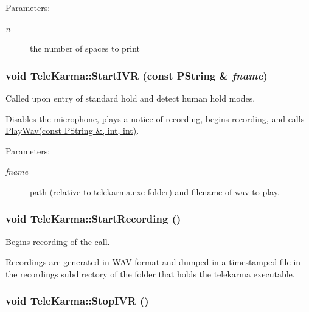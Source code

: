 \begin{Desc}
\item[Parameters:]
\begin{description}
\item[{\em n}]the number of spaces to print \end{description}
\end{Desc}
\hypertarget{classTeleKarma_e7fa2e0e51af227908ddf46de42732f2}{
\subsubsection[{StartIVR}]{\setlength{\rightskip}{0pt plus 5cm}void TeleKarma::StartIVR (const PString \& {\em fname})}}
\label{classTeleKarma_e7fa2e0e51af227908ddf46de42732f2}


Called upon entry of standard hold and detect human hold modes. 

Disables the microphone, plays a notice of recording, begins recording, and calls \hyperlink{}{PlayWav(const PString \&, int, int)}. \begin{Desc}
\item[Parameters:]
\begin{description}
\item[{\em fname}]path (relative to telekarma.exe folder) and filename of wav to play. \end{description}
\end{Desc}
\hypertarget{classTeleKarma_724b39dce3dd92f25a7de9e4a39ccfa7}{
\subsubsection[{StartRecording}]{\setlength{\rightskip}{0pt plus 5cm}void TeleKarma::StartRecording ()}}
\label{classTeleKarma_724b39dce3dd92f25a7de9e4a39ccfa7}


Begins recording of the call. 

Recordings are generated in WAV format and dumped in a timestamped file in the recordings subdirectory of the folder that holds the telekarma executable. \hypertarget{classTeleKarma_9b93b7a0b3af465d07a5facaa445344f}{
\subsubsection[{StopIVR}]{\setlength{\rightskip}{0pt plus 5cm}void TeleKarma::StopIVR ()}}
\label{classTeleKarma_9b93b7a0b3af465d07a5facaa445344f}


